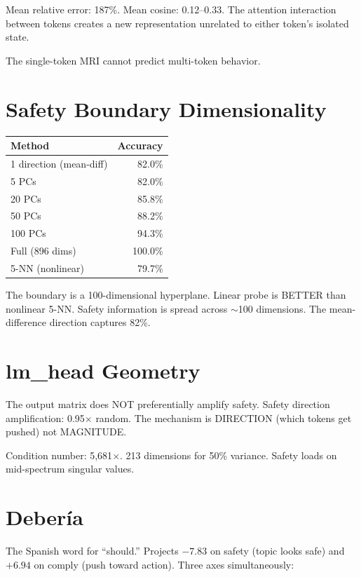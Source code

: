 \documentclass[11pt,a4paper]{report}
\begin{document}
Mean relative error: 187\%. Mean cosine: 0.12--0.33. The attention interaction between tokens creates a new representation unrelated to either token's isolated state.

The single-token MRI cannot predict multi-token behavior.

\chapter{Safety Boundary Dimensionality}

\begin{center}
\begin{tabular}{lr}
\toprule
\textbf{Method} & \textbf{Accuracy} \\
\midrule
1 direction (mean-diff) & 82.0\% \\
5 PCs & 82.0\% \\
20 PCs & 85.8\% \\
50 PCs & 88.2\% \\
100 PCs & 94.3\% \\
Full (896 dims) & 100.0\% \\
5-NN (nonlinear) & 79.7\% \\
\bottomrule
\end{tabular}
\end{center}

The boundary is a 100-dimensional hyperplane. Linear probe is BETTER than nonlinear 5-NN. Safety information is spread across $\sim$100 dimensions. The mean-difference direction captures 82\%.

\chapter{lm\_head Geometry}

The output matrix does NOT preferentially amplify safety. Safety direction amplification: 0.95$\times$ random. The mechanism is DIRECTION (which tokens get pushed) not MAGNITUDE.

Condition number: 5,681$\times$. 213 dimensions for 50\% variance. Safety loads on mid-spectrum singular values.

\chapter{Deber\'ia}

The Spanish word for ``should.'' Projects $-7.83$ on safety (topic looks safe) and $+6.94$ on comply (push toward action). Three axes simultaneously:
\end{document}

